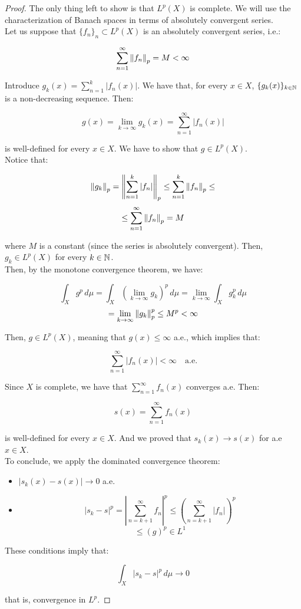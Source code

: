 \begin{proof}
    The only thing left to show is that $L^p(X)$ is complete. We will
    use the characterization of Banach spaces in terms of absolutely
    convergent series.\\

    Let us suppose that $\{f_n\}_n \subset L^p(X)$ is an absolutely
    convergent series, i.e.:

    $$\sum_{n = 1}^{\infty} \left\|f_n\right\|_p = M < \infty$$

    Introduce $g_k(x) = \sum_{n = 1}^k |f_n(x)|$. We have that, for every
    $x \in X$, $\{g_k(x)\}_{k \in \mathbb{N}}$ is a non-decreasing sequence. Then:

    $$g(x) = \lim_{k \to \infty} g_k(x) = \sum_{n = 1}^{\infty} |f_n(x)|$$

    is well-defined for every $x \in X$. We have to show that $g \in L^p(X)$.\\

    Notice that:

    $$\left\|g_k\right\|_p = \left\|\sum_{n = 1}^{k} |f_n|\right\|_p \leq \sum_{n = 1}^{k} \left\|f_n\right\|_p \leq$$
    $$ \leq \sum_{n = 1}^{\infty} \left\|f_n\right\|_p = M$$

    where $M$ is a constant (since the series is absolutely convergent). Then, $g_k \in L^p(X)$
    for every $k \in \mathbb{N}$.\\

    Then, by the monotone convergence theorem, we have:

    $$\int_X g^p \, d\mu = \int_X \left( \lim_{k \to \infty} g_k \right)^p \, d\mu = \lim_{k \to \infty} \int_X g_k^p \, d\mu$$
    $$= \lim_{k \to \infty} \left\|g_k\right\|_p^p \leq M^p < \infty$$

    Then, $g \in L^p(X)$, meaning that $g(x) \leq \infty$ a.e., which implies
    that:

    $$\sum_{n = 1}^{\infty} |f_n(x)| < \infty \quad \text{a.e.}$$

    Since $X$ is complete, we have that $\sum_{n = 1}^{\infty} f_n(x)$ converges a.e.
    Then:

    $$s(x) = \sum_{n = 1}^{\infty} f_n(x)$$

    is well-defined for every $x \in X$. And we proved that $s_k(x) \to s(x)$ for a.e $x \in X$.\\

    To conclude, we apply the dominated convergence theorem:

    \begin{itemize}
        \item $|s_k(x) - s(x)| \to 0$ a.e.
        \item $$ |s_k - s|^p = \left| \sum_{n = k + 1}^{\infty} f_n \right|^p \leq \left( \sum_{n=k+1}^{\infty} |f_n| \right)^p$$
        $$ \leq (g)^p \in L^1$$
    \end{itemize}

    These conditions imply that:

    $$\int_X |s_k - s|^p \, d \mu \to 0$$

    that is, convergence in $L^p$.
\end{proof}

